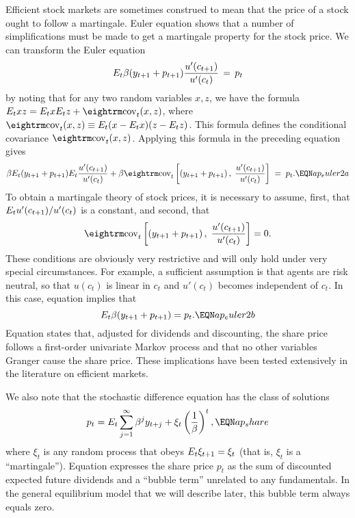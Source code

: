 Efficient stock markets are sometimes construed to mean that the price of a
stock ought to follow a martingale. Euler equation 
shows that a number of simplifications must be made to
get a martingale property for the stock price.  We can transform
the Euler equation
$$
E_t{\beta} (y_{t+1} + p_{t+1}) {u'(c_{t+1}) \over u'(c_t)} \,=\, p_t
$$
by noting that for any two random variables $x,z$, we have the
formula $E_txz=E_tx E_tz+ {\rm cov}_t(x,z)$, where ${\rm cov}_t(x,z)
 \equiv E_t (x-E_tx)(z-E_tz)$.  This formula defines the conditional
covariance ${\rm cov}_t(x,z)$.
%
Applying this formula in the preceding equation gives
$$\be E_t (y_{t+1} + p_{t+1})  E_t {u'(c_{t+1}) \over u'(c_t)}
+\be \cov_t \left[(y_{t+1} + p_{t+1})\,,\; {u'(c_{t+1}) \over u'(c_t)} \right]
\;=\; p_t.                                          \EQN ap_euler2a   $$
To obtain a martingale theory of stock prices, it is necessary to assume,
first, that $E_t u'(c_{t+1})/u'(c_t)$ is a constant, and second, that
$$\cov_t \left[(y_{t+1} + p_{t+1})\,,\; {u'(c_{t+1}) \over u'(c_t)} \right] = 0.
$$
These conditions are obviously very restrictive and will only hold under
very special circumstances. For example, a sufficient assumption is that
agents are risk neutral, so that $u(c_t)$ is linear in $c_t$ and $u'(c_t)$
becomes independent of $c_t$.  In this case, equation 
implies that
$$E_t\be (y_\tone+p_\tone) = p_t.    \EQN ap_euler2b$$
Equation  states that, adjusted for
dividends and discounting, the share price follows a first-order
univariate Markov process and that no other variables Granger cause
the share price.  These implications have been tested extensively
in the literature on efficient markets.

We also note that the stochastic difference equation  has
the class of solutions
$$p_t=E_t \sum_{j=1}^\infty \be^j y_{t+j} +\xi_t
\left({1\over\be}\right)^t,                \EQN ap_share $$
where $\xi_t$ is any random process that obeys $E_t \xi_{{t+1}}=\xi_t$ (that
is, $\xi_t$ is a ``martingale''). Equation  expresses the
share price $p_t$ as the sum of discounted expected
future dividends and a ``bubble term'' unrelated to any fundamentals. In the
general equilibrium model that we will describe later,
this bubble term always equals zero.


